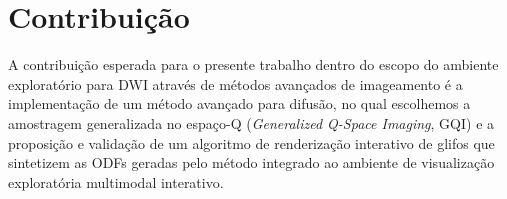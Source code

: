 \documentclass[
    12pt,                %
    oneside,            %
    a4paper,            %
    english,            %
    french,                %
    spanish,            %
    brazil                %
    ]{abntex2}
\begin{document}















\section{Contribuição}
\label{sec:contribuicoes}

A contribuição esperada para o presente trabalho dentro do escopo do ambiente exploratório para DWI através de métodos avançados de imageamento é a implementação de um método avançado para difusão, no qual escolhemos a amostragem generalizada no espaço-Q (\textit{Generalized Q-Space Imaging}, GQI) \cite{yeh2010} e a proposição e validação de um algoritmo de renderização interativo de glifos que sintetizem as ODFs geradas pelo método integrado ao ambiente de visualização exploratória multimodal interativo.
\end{document}

